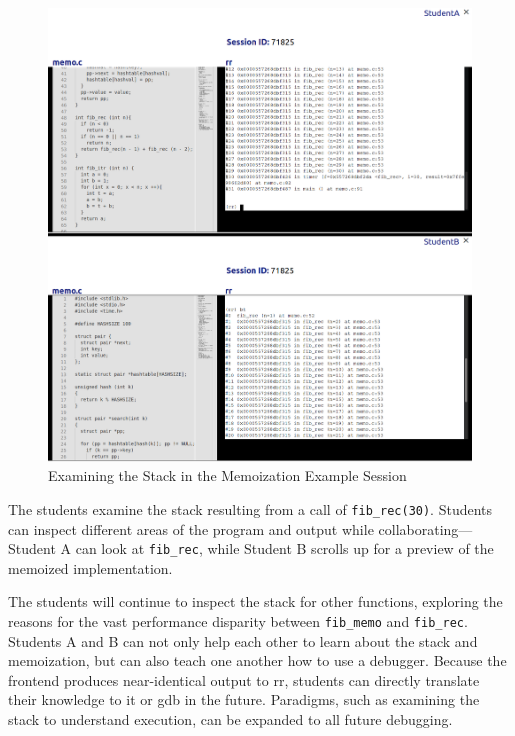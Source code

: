 \documentclass[12pt]{article}
\begin{document}
\begin{figure}[h!]

  \includegraphics[width=\textwidth]{session5i}
  \centering
  \caption{Examining the Stack in the Memoization Example
    Session}
  \label{session5i}
\end{figure}

The students examine the stack resulting from a call of
\lstinline{fib_rec(30)}.  Students can inspect different areas of the
program and output while collaborating---Student A can look at
\lstinline{fib_rec}, while Student B scrolls up for a preview of the
memoized implementation.
\par

The students will continue to inspect the stack for other functions,
exploring the reasons for the vast performance disparity between
\lstinline{fib_memo} and \lstinline{fib_rec}.  Students A and B can
not only help each other to learn about the stack and memoization, but
can also teach one another how to use a debugger.  Because the
frontend produces near-identical output to rr, students can directly
translate their knowledge to it or gdb in the future.  Paradigms, such
as examining the stack to understand execution, can be expanded to all
future debugging.
\end{document}
